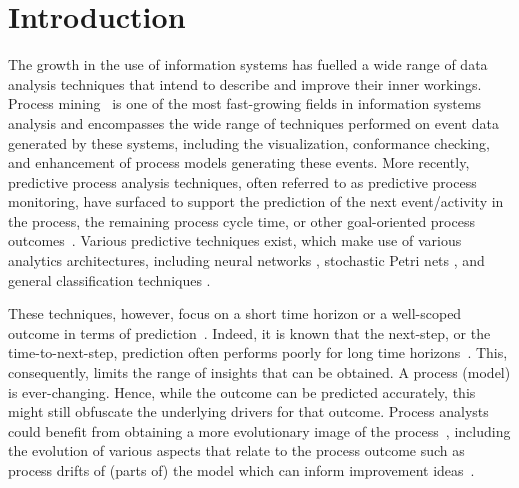 \section{Introduction}\label{sec:introduction}

The growth in the use of information systems has fuelled a wide range of data analysis techniques that intend to describe and improve their inner workings.
Process mining~\cite{van2016data} is one of the most fast-growing fields in information systems analysis and encompasses the wide range of techniques performed on event data generated by these systems, including the visualization, conformance checking, and enhancement of process models generating these events.
More recently, predictive process analysis techniques, often referred to as predictive process monitoring, have surfaced to support the prediction of the next event/activity in the process, the remaining process cycle time, or other goal-oriented process outcomes~\cite{DBLP:conf/bpm/Francescomarino18}.
Various predictive techniques exist, which make use of various analytics architectures, including neural networks \cite{DBLP:conf/caise/TaxVRD17}, stochastic Petri nets \cite{DBLP:conf/icsoc/Rogge-SoltiW13}, and general classification techniques \cite{DBLP:journals/tkdd/TeinemaaDRM19}.

These techniques, however, focus on a short time horizon or a well-scoped outcome in terms of prediction~\cite{DBLP:journals/tkdd/TeinemaaDRM19}.
Indeed, it is known that the next-step, or the time-to-next-step, prediction often performs poorly for long time horizons~\cite{park2020predicting}.
This, consequently, limits the range of insights that can be obtained. 
A process (model) is ever-changing. Hence, while the outcome can be predicted accurately, this might still obfuscate the underlying drivers for that outcome.
Process analysts could benefit from obtaining a more evolutionary image of the process~\cite{DBLP:conf/bpm/PollPRRR18}, including the evolution of various aspects that relate to the process outcome such as process drifts of (parts of) the model which can inform improvement ideas~\cite{van2015pm}. 


